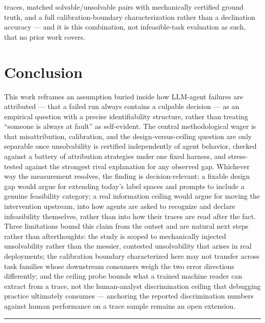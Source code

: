 \documentclass[11pt]{article}
\begin{document}
traces, matched solvable/unsolvable pairs with mechanically certified ground truth, and a full calibration-boundary characterization rather than a declination accuracy --- and it is this combination, not infeasible-task evaluation as such, that no prior work covers.

\section{Conclusion}

This work reframes an assumption buried inside how LLM-agent failures are attributed --- that a failed run always contains a culpable decision --- as an empirical question with a precise identifiability structure, rather than treating ``someone is always at fault'' as self-evident. The central methodological wager is that misattribution, calibration, and the design-versus-ceiling question are only separable once unsolvability is certified independently of agent behavior, checked against a battery of attribution strategies under one fixed harness, and stress-tested against the strongest rival explanation for any observed gap. Whichever way the measurement resolves, the finding is decision-relevant: a fixable design gap would argue for extending today's label spaces and prompts to include a genuine feasibility category; a real information ceiling would argue for moving the intervention upstream, into how agents are asked to recognize and declare infeasibility themselves, rather than into how their traces are read after the fact. Three limitations bound this claim from the outset and are natural next steps rather than afterthoughts: the study is scoped to mechanically injected unsolvability rather than the messier, contested unsolvability that arises in real deployments; the calibration boundary characterized here may not transfer across task families whose downstream consumers weigh the two error directions differently; and the ceiling probe bounds what a trained machine reader can extract from a trace, not the human-analyst discrimination ceiling that debugging practice ultimately consumes --- anchoring the reported discrimination numbers against human performance on a trace sample remains an open extension.

\vspace{1em}
\hrule
\vspace{1em}
\end{document}
